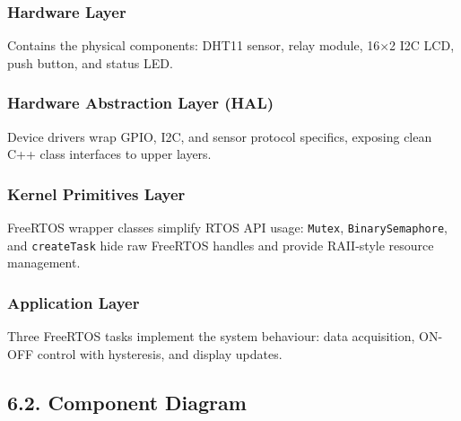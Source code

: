 \documentclass[12pt]{article}
\begin{document}
\subsubsection*{Hardware Layer}
Contains the physical components: DHT11 sensor, relay module, 16$\times$2 I2C LCD,
push button, and status LED.

\subsubsection*{Hardware Abstraction Layer (HAL)}
Device drivers wrap GPIO, I2C, and sensor protocol specifics, exposing clean C++
class interfaces to upper layers.

\subsubsection*{Kernel Primitives Layer}
FreeRTOS wrapper classes simplify RTOS API usage: \texttt{Mutex},
\texttt{BinarySemaphore}, and \texttt{createTask} hide raw FreeRTOS handles and
provide RAII-style resource management.

\subsubsection*{Application Layer}
Three FreeRTOS tasks implement the system behaviour: data acquisition, ON-OFF
control with hysteresis, and display updates.

\subsection*{6.2. Component Diagram}

\end{document}
